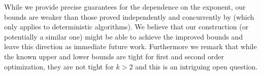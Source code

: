 \documentclass[final,12pt]{colt2018} %
\begin{document}
While we provide precise guarantees for the dependence on the exponent, our bounds are weaker than those proved independently and concurrently by \cite{shamir2017oracle} (which only applies to deterministic algorithms). We believe that our construction (or potentially a similar one) might be able to achieve the improved bounds and leave this direction as immediate future work. Furthermore we remark that while the known upper and lower bounds are tight for first and second order optimization, they are not tight for $k > 2$ and this is an intriguing open question. 










\pagebreak


\appendix

\end{document}
